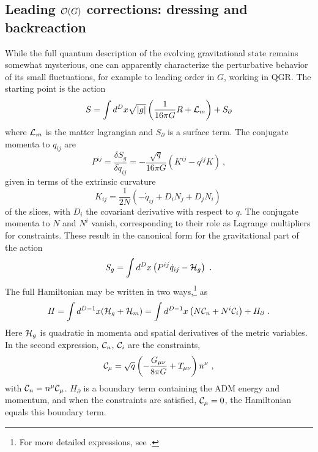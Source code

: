 \documentclass[12pt]{article}
\numberwithin{equation}{section}
\newcommand{\calC}{{\cal C}}
\newcommand{\calo}{{\cal O}}
\newcommand{\calh}{{\cal H}}
\newcommand{\call}{{\cal L}}
\newcommand{\beq}{\begin{equation}}
\newcommand{\eeq}{\end{equation}}
\begin{document}
\subsection{Leading $\calo(G)$ corrections: dressing and backreaction}

While the full quantum description of the evolving gravitational state remains somewhat mysterious, one can apparently characterize the perturbative behavior of its small fluctuations, for example to leading order in $G$, working in QGR.  The starting point is the action
\beq\label{gravaction}
S=\int d^Dx \sqrt{|g|} \left( \frac{1}{16\pi G} R + \call_m\right) + S_\partial
\eeq
where $\call_m$ is the matter lagrangian and $S_\partial$ is a surface term.  
The conjugate momenta to $q_{ij}$ are
\beq
P^{ij}=  \frac{\delta S_g}{\delta \dot q_{ij}} = -\frac{\sqrt q}{16\pi G}\left(K^{ij}- q^{ij} K\right)\ ,
\eeq
given in terms of the extrinsic curvature
\beq\label{excu}
K_{ij}= \frac{1}{2N}\left(-\dot q_{ij} + D_iN_j + D_jN_i\right)\ 
\eeq
of the slices, with $D_i$ the covariant derivative with respect to $q$.  The conjugate momenta to $N$ and $N^i$ vanish, corresponding to their role as Lagrange multipliers for constraints.  These result in the canonical form for the gravitational part of the action
\beq\label{CGact}
S_g = \int d^D x \left( P^{ij}  \dot q_{ij} -  \calh_g\right)\ .
\eeq
The full Hamiltonian may be written in two ways,\footnote{For more detailed expressions, see \cite{GiPe2}.} as
\beq\label{Hreln}
H = \int d^{D-1}x (\calh_g+ \calh_m) =  \int d^{D-1}x \left(N \calC_n + N^i \calC_i\right) + H_\partial\ .
\eeq
Here $\calh_g$ is quadratic in momenta and spatial derivatives of the metric variables.  In the second expression, $\calC_n$, $\calC_i$ are the constraints, 
\beq
\calC_\mu =\sqrt q \left( -\frac{G_{\mu\nu}}{8\pi G} + T_{\mu\nu} \right) n^\nu\ ,
\eeq 
with $\calC_n=n^\mu \calC_\mu$.   $H_\partial$ is a boundary term containing the ADM energy and momentum, and when the constraints are satisfied, $\calC_\mu=0$, the Hamiltonian equals this boundary term.
\end{document}

